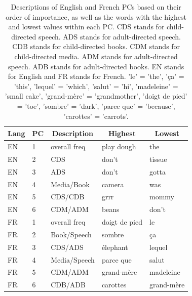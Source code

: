 \documentclass[10pt, letterpaper]{article}
\newenvironment{CodeChunk}{}{}
\begin{document}
\begin{CodeChunk}



\begin{table}[tbp]

\begin{center}
\begin{threeparttable}

\caption{\label{tab:table1}Descriptions of English and French PCs based on their order of importance, as well as the words with the highest and lowest values within each PC. CDS stands for child-directed speech. ADS stands for adult-directed speech. CDB stands for child-directed books. CDM stands for child-directed media. ADM stands for adult-directed speech. ADB stands for adult-directed books. EN stands for English and FR stands for French. 'le' = 'the', 'ça' = 'this', 'lequel' = 'which', 'salut' = 'hi', 'madeleine' = 'small cake', 'grand-mère' = 'grandmother', 'doigt de pied' = 'toe', 'sombre' = 'dark', 'parce que' = 'because', 'carottes' = 'carrots'.}

\begin{tabular}{lllll}
\toprule
Lang & \multicolumn{1}{c}{PC} & \multicolumn{1}{c}{Description} & \multicolumn{1}{c}{Highest} & \multicolumn{1}{c}{Lowest}\\
\midrule
EN & 1 & overall freq & play dough & the\\
EN & 2 & CDS & don't & tissue\\
EN & 3 & ADS & don't & gotta\\
EN & 4 & Media/Book & camera & was\\
EN & 5 & CDS/CDB & grrr & mommy\\
EN & 6 & CDM/ADM & beans & don't\\
FR & 1 & overall freq & doigt de pied & le\\
FR & 2 & Book/Speech & sombre & ça\\
FR & 3 & CDS/ADS & élephant & lequel\\
FR & 4 & Media/Speech & parce que & salut\\
FR & 5 & CDM/ADM & grand-mère & madeleine\\
FR & 6 & CDB/ADB & carottes & grand-mère\\
\bottomrule
\end{tabular}

\end{threeparttable}
\end{center}

\end{table}


\end{CodeChunk}
\end{document}
